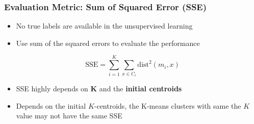 \documentclass[aspectratio=169, 10pt]{beamer}
\begin{document}
\begin{frame}
    \frametitle{Evaluation Metric: Sum of Squared Error (SSE)}
    
    \begin{itemize}
        \item No true labels are available in the unsupervised learning
        \item Use sum of the squared errors to evaluate the performance
    \end{itemize}

    \[
        \text{SSE} = \sum^{K}_{i=1} \sum_{x \in C_i} \text{dist}^2(m_i, x)
    \]

    \begin{itemize}
        \item SSE highly depends on \textbf{K} and the \textbf{initial centroids}
        \item Depends on the initial $K$-centroids, the K-means clusters with same the $K$ value may not have the same SSE
    \end{itemize}
    
\end{frame}
\end{document}
